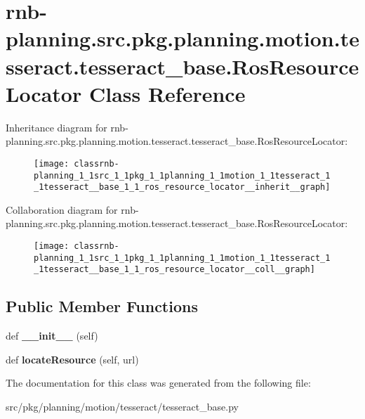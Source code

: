 \hypertarget{classrnb-planning_1_1src_1_1pkg_1_1planning_1_1motion_1_1tesseract_1_1tesseract__base_1_1_ros_resource_locator}{}\section{rnb-\/planning.src.\+pkg.\+planning.\+motion.\+tesseract.\+tesseract\+\_\+base.\+Ros\+Resource\+Locator Class Reference}
\label{classrnb-planning_1_1src_1_1pkg_1_1planning_1_1motion_1_1tesseract_1_1tesseract__base_1_1_ros_resource_locator}


Inheritance diagram for rnb-\/planning.src.\+pkg.\+planning.\+motion.\+tesseract.\+tesseract\+\_\+base.\+Ros\+Resource\+Locator\+:\nopagebreak
\begin{figure}[H]
\begin{center}
\leavevmode
\texttt{[image: classrnb-planning\_1\_1src\_1\_1pkg\_1\_1planning\_1\_1motion\_1\_1tesseract\_1\_1tesseract\_\_base\_1\_1\_ros\_resource\_locator\_\_inherit\_\_graph]}
\end{center}
\end{figure}


Collaboration diagram for rnb-\/planning.src.\+pkg.\+planning.\+motion.\+tesseract.\+tesseract\+\_\+base.\+Ros\+Resource\+Locator\+:\nopagebreak
\begin{figure}[H]
\begin{center}
\leavevmode
\texttt{[image: classrnb-planning\_1\_1src\_1\_1pkg\_1\_1planning\_1\_1motion\_1\_1tesseract\_1\_1tesseract\_\_base\_1\_1\_ros\_resource\_locator\_\_coll\_\_graph]}
\end{center}
\end{figure}
\subsection*{Public Member Functions}
\begin{DoxyCompactItemize}
\item 
\mbox{\label{classrnb-planning_1_1src_1_1pkg_1_1planning_1_1motion_1_1tesseract_1_1tesseract__base_1_1_ros_resource_locator_a0cdf328eb7ecb6649d9ee033d437f7f5}} 
def {\bfseries \+\_\+\+\_\+init\+\_\+\+\_\+} (self)
\item 
\mbox{\label{classrnb-planning_1_1src_1_1pkg_1_1planning_1_1motion_1_1tesseract_1_1tesseract__base_1_1_ros_resource_locator_a5645f7bd3b4aa5d4751e2ec1aee94e82}} 
def {\bfseries locate\+Resource} (self, url)
\end{DoxyCompactItemize}


The documentation for this class was generated from the following file\+:\begin{DoxyCompactItemize}
\item 
src/pkg/planning/motion/tesseract/tesseract\+\_\+base.\+py\end{DoxyCompactItemize}
